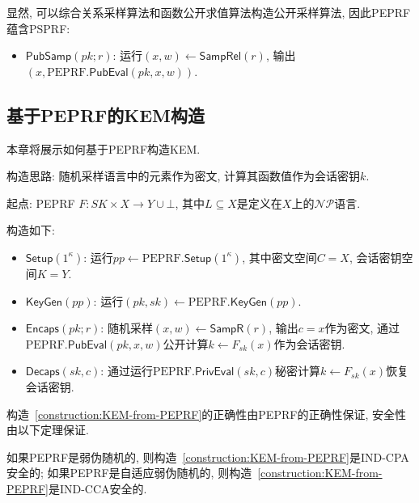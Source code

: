 显然, 可以综合关系采样算法和函数公开求值算法构造公开采样算法, 因此PEPRF蕴含PSPRF: 
\begin{itemize}
    \item $\mathsf{PubSamp}(pk; r)$: 运行$(x, w) \leftarrow \mathsf{SampRel}(r)$, 
        输出$(x, \text{PEPRF}.\mathsf{PubEval}(pk, x, w))$. 
\end{itemize}

\subsection{基于PEPRF的KEM构造}
本章将展示如何基于PEPRF构造KEM. 

\begin{construction}[基于PEPRF的KEM构造]\label{construction:KEM-from-PEPRF}
\begin{trivlist}
    \item 构造思路: 随机采样语言中的元素作为密文, 计算其函数值作为会话密钥$k$. 

    \item 起点: PEPRF $F: SK \times X \rightarrow Y \cup \bot$, 其中$L \subseteq X$是定义在$X$上的$\mathcal{NP}$语言. 
\end{trivlist}
构造如下: 
\begin{itemize}
    \item $\mathsf{Setup}(1^\kappa)$: 运行$pp \leftarrow \text{PEPRF}.\mathsf{Setup}(1^\kappa)$, 
        其中密文空间$C = X$, 会话密钥空间$K = Y$. 

    \item $\mathsf{KeyGen}(pp)$: 运行$(pk, sk) \leftarrow \text{PEPRF}.\mathsf{KeyGen}(pp)$. 

    \item $\mathsf{Encaps}(pk; r)$: 随机采样$(x, w) \leftarrow \mathsf{SampR}(r)$, 输出$c = x$作为密文, 
        通过$\text{PEPRF}.\mathsf{PubEval}(pk, x, w)$公开计算$k \leftarrow F_{sk}(x)$作为会话密钥. 

    \item $\mathsf{Decaps}(sk, c)$: 通过运行$\text{PEPRF}.\mathsf{PrivEval}(sk, c)$秘密计算$k \leftarrow F_{sk}(x)$恢复会话密钥.
\end{itemize}
\end{construction}

构造~\ref{construction:KEM-from-PEPRF}的正确性由PEPRF的正确性保证, 安全性由以下定理保证. 

\begin{theorem}
如果PEPRF是弱伪随机的, 则构造~\ref{construction:KEM-from-PEPRF}是IND-CPA安全的; 
如果PEPRF是自适应弱伪随机的, 则构造~\ref{construction:KEM-from-PEPRF}是IND-CCA安全的.  
\end{theorem}


